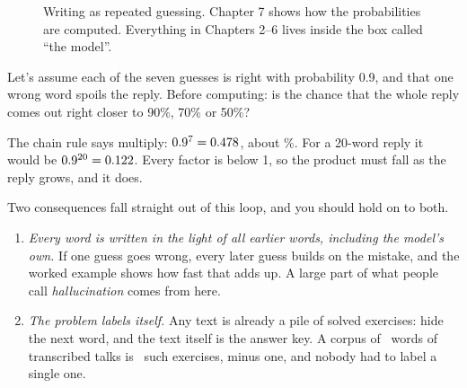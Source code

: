 \begin{figure}[h]
\centering
{}
\caption{Writing as repeated guessing. Chapter 7 shows how the probabilities are computed. Everything in
Chapters 2--6 lives inside the box called ``the model''.}
\label{fig:loop}
\end{figure}

\Predict Let's assume each of the seven guesses is right with probability 0.9, and that one wrong word spoils
the reply. Before computing: is the chance that the whole reply comes out right closer to 90\%, 70\% or 50\%?

The chain rule says multiply: $0.9^7 = 0.478$, about \nOneSevenPct\%. For a 20-word reply it would be
$0.9^{20}=0.122$.
\Sanity Every factor is below 1, so the product must fall as the reply grows, and it does.

\Why Two consequences fall straight out of this loop, and you should hold on to both.
\begin{enumerate}[label=(\roman*)]
\item \emph{Every word is written in the light of all earlier words, including the model's own.} If one guess
goes wrong, every later guess builds on the mistake, and the worked example shows how fast that adds up. A large
part of what people call \emph{hallucination} comes from here.
\item \emph{The problem labels itself.} Any text is already a pile of solved exercises: hide the next word, and
the text itself is the answer key. A corpus of \cTrainWords\ words of transcribed talks is \cTrainWords\ such
exercises, minus one, and nobody had to label a single one.
\end{enumerate}

